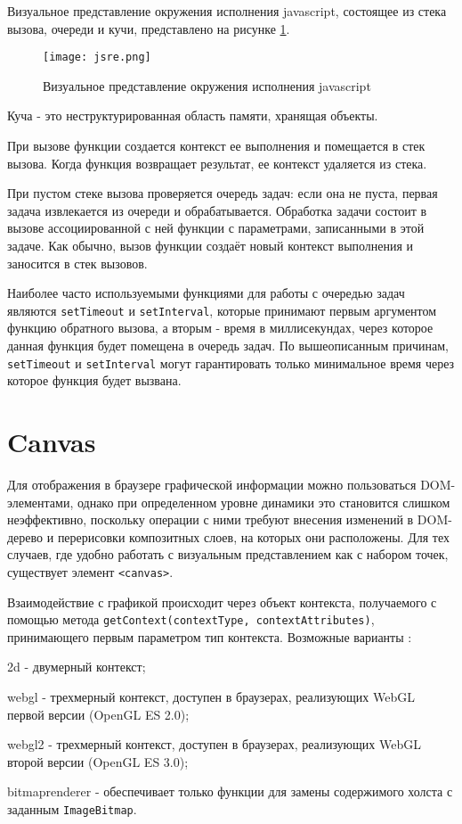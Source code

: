 Визуальное представление окружения исполнения javascript, состоящее из стека вызова, очереди и кучи, представлено на рисунке \ref{fig:jsre}.

\begin{figure}[htbp]
	\centering
	\texttt{[image: jsre.png]}
	\caption{Визуальное представление окружения исполнения javascript}%
	\label{fig:jsre}
\end{figure}

Куча - это неструктурированная область памяти, хранящая объекты.

При вызове функции создается контекст ее выполнения и помещается в стек вызова. Когда функция возвращает результат, ее контекст удаляется из стека.

При пустом стеке вызова проверяется очередь задач: если она не пуста, первая задача извлекается из очереди и обрабатывается. Обработка задачи состоит в вызове  ассоциированной с ней функции с параметрами, записанными в этой задаче. Как обычно, вызов функции создаёт новый контекст выполнения и заносится в стек вызовов. \cite{mdn-el}

Наиболее часто используемыми функциями для работы с очередью задач являются \lstinline|setTimeout| и \lstinline|setInterval|, которые принимают первым аргументом функцию обратного вызова, а вторым - время в миллисекундах, через которое данная функция будет помещена в очередь задач. По вышеописанным причинам, \lstinline|setTimeout| и \lstinline|setInterval| могут гарантировать только минимальное время через которое функция будет вызвана.


\section{Canvas}

Для отображения в браузере графической информации можно пользоваться DOM-элементами, однако при определенном уровне динамики это становится слишком неэффективно, поскольку операции с ними требуют внесения изменений в DOM-дерево и перерисовки композитных слоев, на которых они расположены. Для тех случаев, где удобно работать с визуальным представлением как с набором точек, существует элемент \lstinline|<canvas>|.

Взаимодействие с графикой происходит через объект контекста, получаемого с помощью метода \lstinline|getContext(contextType, contextAttributes)|, принимающего первым параметром тип контекста. Возможные варианты \cite{get-context}:
\begin{itemize*}
	\item 2d - двумерный контекст;
	\item webgl - трехмерный контекст, доступен в браузерах, реализующих WebGL первой версии (OpenGL ES 2.0);
	\item webgl2 - трехмерный контекст, доступен в браузерах, реализующих WebGL второй версии (OpenGL ES 3.0);
	\item bitmaprenderer - обеспечивает только функции для замены содержимого холста с заданным \lstinline|ImageBitmap|.
\end{itemize*}

